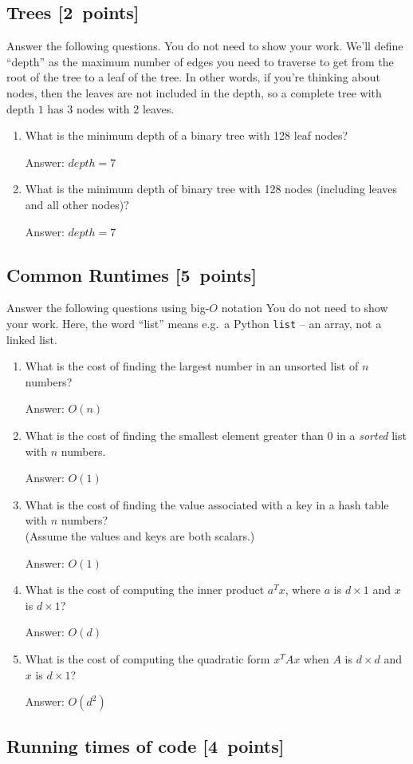 \documentclass{article}
\newcommand{\blu}[1]{{\textcolor{blu}{#1}}}
\newcommand{\gre}[1]{\textcolor{gre}{#1}}
\newcommand\ans[1]{\par\gre{Answer: #1}}
\let\ask\blu
\newcommand\pts[1]{\textcolor{pointscolour}{[#1~points]}}
\begin{document}
  \subsection{Trees \pts{2}}

  \ask{Answer the following questions.} You do not need to show your work. We'll define ``depth'' as the maximum number of edges you need to traverse to get from the root of the tree to a leaf of the tree. In other words, if you're thinking about nodes, then the leaves are not included in the depth, so a complete tree with depth $1$ has 3 nodes with 2 leaves.


  \begin{enumerate}
  \item What is the minimum depth of a binary tree with 128 leaf nodes?
  \ans{$depth = 7$}
  \item What is the minimum depth of binary tree with 128 nodes (including leaves and all other nodes)?
  \ans{$depth = 7$}
  \end{enumerate}
  \newpage
  \subsection{Common Runtimes \pts{5}}

  \ask{Answer the following questions using big-$O$ notation} You do not need to show your work.
  Here, the word ``list'' means e.g.\ a Python \texttt{list} -- an array, not a linked list.
  \begin{enumerate}
  \item What is the cost of finding the largest number in an unsorted list of $n$ numbers?
  \ans{$O(n)$}
  \item What is the cost of finding the smallest element greater than 0 in a \emph{sorted} list with $n$ numbers.
  \ans{$O(1)$}
  \item What is the cost of finding the value associated with a key in a hash table with $n$ numbers? \\(Assume the values and keys are both scalars.)
  \ans{$O(1)$}
  \item What is the cost of computing the inner product $a^Tx$, where $a$ is $d \times 1$ and $x$ is $d \times 1$?
  \ans{$O(d)$}
  \item What is the cost of computing the quadratic form $x^TAx$ when $A$ is $d \times d$ and $x$ is $d \times 1$?
  \ans{$O(d^2)$}
  \end{enumerate}
  \newpage
  \subsection{Running times of code \pts{4}}
\end{document}
